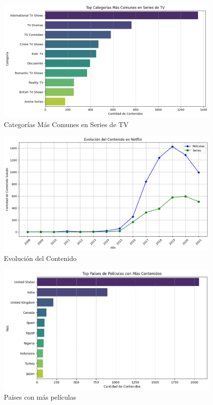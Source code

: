 \documentclass{article}
\begin{document}
\begin{figure}[H]
    \centering
    \includegraphics[width=\textwidth]{Graphs/categorias_series.png}
    \caption{Categorías Más Comunes en Series de TV}
    \label{fig:categorías_series}
\end{figure}

\begin{figure}[H]
    \centering
    \includegraphics[width=\textwidth]{Graphs/evolucion_contenido.png}
    \caption{Evolución del Contenido}
    \label{fig:evolucion_contenido}
\end{figure}

\begin{figure}[H]
    \centering
    \includegraphics[width=\textwidth]{Graphs/paises_peliculas.png}
    \caption{Países con más películas}
    \label{fig:peliculas_paises}
\end{figure}
\end{document}
